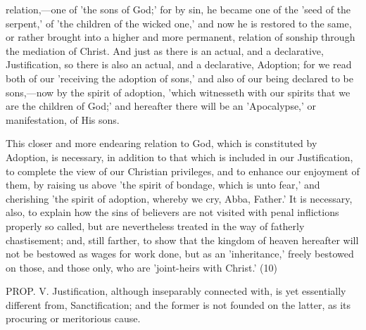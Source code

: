 \documentclass[
]{book}
\begin{document}
relation,---one of 'the sons of God;' for by sin, he became one of the 'seed of the serpent,' of 'the children of the wicked one,' and now he is restored to the same, or rather brought into a higher and more permanent, relation of sonship through the mediation of Christ. And just as there is an actual, and a declarative, Justification, so there is also an actual, and a declarative, Adoption; for we read both of our 'receiving the adoption of sons,' and also of our being declared to be sons,---now by the spirit of adoption, 'which witnesseth with our spirits that we are the children of God;' and hereafter there will be an 'Apocalypse,' or manifestation, of His sons.

This closer and more endearing relation to God, which is constituted by Adoption, is necessary, in addition to that which is included in our Justification, to complete the view of our Christian privileges, and to enhance our enjoyment of them, by raising us above 'the spirit of bondage, which is unto fear,' and cherishing 'the spirit of adoption, whereby we cry, Abba, Father.' It is necessary, also, to explain how the sins of believers are not visited with penal inflictions properly so called, but are nevertheless treated in the way of fatherly chastisement; and, still farther, to show that the kingdom of heaven hereafter will not be bestowed as wages for work done, but as an 'inheritance,' freely bestowed on those, and those only, who are 'joint-heirs with Christ.' (10)

PROP. V. Justification, although inseparably connected with, is yet essentially different from, Sanctification; and the former is not founded on the latter, as its procuring or meritorious cause.
\end{document}
